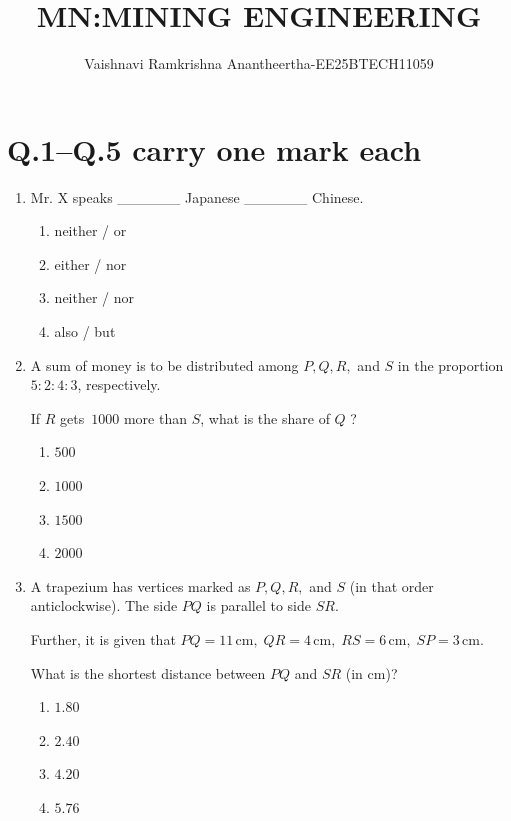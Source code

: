 \documentclass[journal,12pt,onecolumn]{IEEEtran}
\title{\Huge MN:MINING ENGINEERING}
\author{Vaishnavi Ramkrishna Anantheertha-EE25BTECH11059}
\theoremstyle{remark}
\begin{document}
\maketitle

\section*{Q.1--Q.5 carry one mark each}
\begin{enumerate}
\item Mr. X speaks \_\_\_\_\_\_ Japanese \_\_\_\_\_\_ Chinese.  

\hfill{}
\begin{multicols}{4}
\begin{enumerate}
\item neither / or 
\item either / nor
\item neither / nor
\item also / but
\end{enumerate}
\end{multicols}
\item A sum of money is to be distributed among $P, Q, R,$ and $S$ in the proportion $5 \colon 2 \colon 4 \colon 3$, respectively.  

If $R$ gets $\, 1000$ more than $S$, what is the share of $Q$ ?

\hfill{}
\begin{multicols}{4}
\begin{enumerate}
\item $500$
\item $1000$
\item $1500$
\item $2000$
\end{enumerate}
\end{multicols}
\item A trapezium has vertices marked as $P, Q, R,$ and $S$ (in that order anticlockwise).  
The side $PQ$ is parallel to side $SR$.  

Further, it is given that $PQ = 11 \,\text{cm}, \; QR = 4 \,\text{cm}, \; RS = 6 \,\text{cm}, \; SP = 3 \,\text{cm}$.  

What is the shortest distance between $PQ$ and $SR$ (in cm)?

\hfill{}    
\begin{enumerate}
    \item $1.80$
    \item $2.40$
    \item $4.20$
    \item $5.76$


\end{enumerate}
\end{enumerate}
\end{document}
